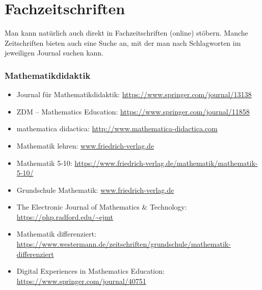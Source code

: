 \documentclass{../cssheet}
\begin{document}
\section{Fachzeitschriften}

Man kann natürlich auch direkt in Fachzeitschriften (online) stöbern. Manche Zeitschriften bieten auch eine Suche an, mit der man nach Schlagworten im jeweiligen Journal suchen kann.
\subsubsection*{Mathematikdidaktik}

\begin{itemize}
\item Journal für Mathematikdidaktik: \url{https://www.springer.com/journal/13138}
\item ZDM -- Mathematics Education: \url{https://www.springer.com/journal/11858}
\item mathematica didactica: \url{http://www.mathematica-didactica.com}
\item Mathematik lehren: \href{https://www.friedrich-verlag.de/mathematik/mathematik-lehren/}{www.friedrich-verlag.de}
\item Mathematik 5-10: \url{https://www.friedrich-verlag.de/mathematik/mathematik-5-10/}
\item Grundschule Mathematik: \href{https://www.friedrich-verlag.de/grundschule/mathematik/grundschule-mathematik/}{www.friedrich-verlag.de}
\item The Electronic Journal of Mathematics \& Technology: \url{https://php.radford.edu/~ejmt}
\item Mathematik differenziert: \url{https://www.westermann.de/zeitschriften/grundschule/mathematik-differenziert}
\item Digital Experiences in Mathematics Education: \url{https://www.springer.com/journal/40751}
\end{itemize}
\end{document}
